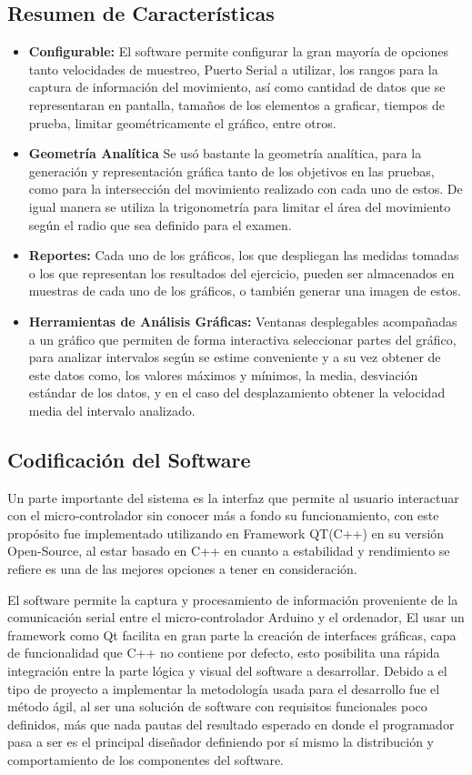 \documentclass[12pt,a4paper]{article}
\begin{document}
\subsection{Resumen de Características}
\begin{itemize}
	\item \textbf{Configurable:} El software permite configurar la gran mayoría de opciones tanto velocidades de muestreo, Puerto Serial a utilizar, los rangos para la captura de información del movimiento, así como cantidad de datos que se representaran en pantalla, tamaños de los elementos a graficar, tiempos de prueba, limitar geométricamente el gráfico, entre otros.
	\item \textbf{Geometría Analítica} Se usó bastante la geometría analítica, para la generación y representación gráfica tanto de los objetivos en las pruebas, como para la intersección del movimiento realizado con cada uno de estos. De igual manera se utiliza la trigonometría para limitar el área del movimiento según el radio que sea definido para el examen.
	\item \textbf{Reportes:} Cada uno de los gráficos, los que despliegan las medidas tomadas o los que representan los resultados del ejercicio, pueden ser almacenados en muestras de cada uno de los gráficos, o también generar una imagen de estos.
	\item \textbf{Herramientas de Análisis Gráficas:} Ventanas desplegables acompañadas a un gráfico que permiten de forma interactiva seleccionar partes del gráfico, para analizar intervalos según se estime conveniente y a su vez obtener de este datos como, los valores máximos y mínimos, la media, desviación estándar de los datos, y en el caso del desplazamiento obtener la velocidad media del intervalo analizado.
\end{itemize}

\subsection{Codificación del Software}
Un parte importante del sistema es la interfaz que permite al usuario interactuar con el micro-controlador sin conocer más a fondo su funcionamiento,
con este propósito fue implementado utilizando en Framework QT(C++)\cite{QT} en su versión Open-Source, al estar basado en C++ en cuanto a estabilidad y rendimiento se refiere es una de las mejores opciones a tener en consideración.

El software permite la captura y procesamiento de información proveniente de la comunicación serial entre el micro-controlador Arduino y el ordenador,
El usar un framework como Qt facilita en gran parte la creación de interfaces gráficas, capa de funcionalidad que C++ no contiene por defecto, esto posibilita una rápida integración entre la parte lógica y visual del software a desarrollar.
Debido a el tipo de proyecto a implementar la metodología usada para el desarrollo fue el método ágil, al ser una solución de software con requisitos funcionales poco definidos, más que nada pautas del resultado esperado en donde el programador pasa a ser es el principal diseñador definiendo por sí mismo la distribución y comportamiento de los componentes del software.
\end{document}
